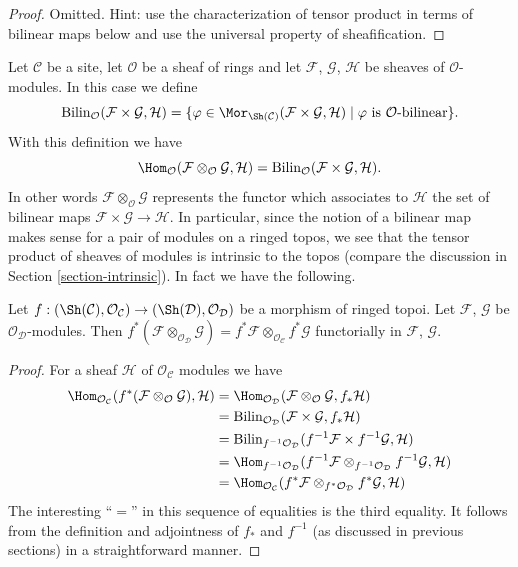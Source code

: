 \begin{proof}
Omitted. Hint: use the characterization of tensor product in terms
of bilinear maps below and use the universal property of sheafification.
\end{proof}

\noindent
Let $\mathcal{C}$ be a site, let $\mathcal{O}$ be a sheaf of rings and let
$\mathcal{F}$, $\mathcal{G}$, $\mathcal{H}$ be sheaves of
$\mathcal{O}$-modules. In this case we define
$$
\text{Bilin}_\mathcal{O}(\mathcal{F} \times \mathcal{G}, \mathcal{H})
=
\{\varphi \in
\Mor_{\Sh(\mathcal{C})}(
\mathcal{F} \times \mathcal{G}, \mathcal{H}) \mid
\varphi \text{ is }\mathcal{O}\text{-bilinear}\}.
$$
With this definition we have
$$
\Hom_\mathcal{O}
(\mathcal{F} \otimes_\mathcal{O} \mathcal{G}, \mathcal{H})
=
\text{Bilin}_\mathcal{O}(\mathcal{F} \times \mathcal{G}, \mathcal{H}).
$$
In other words $\mathcal{F} \otimes_\mathcal{O} \mathcal{G}$
represents the functor which associates to $\mathcal{H}$ the set
of bilinear maps $\mathcal{F} \times \mathcal{G} \to \mathcal{H}$.
In particular, since the notion of a bilinear map makes sense for
a pair of modules on a ringed topos, we see that the tensor
product of sheaves of modules is intrinsic to the topos (compare
the discussion in Section \ref{section-intrinsic}). In fact we
have the following.

\begin{lemma}
\label{lemma-tensor-product-pullback}
Let $f : (\Sh(\mathcal{C}), \mathcal{O}_\mathcal{C})
\to (\Sh(\mathcal{D}), \mathcal{O}_\mathcal{D})$ be
a morphism of ringed topoi. Let $\mathcal{F}$, $\mathcal{G}$
be $\mathcal{O}_\mathcal{D}$-modules. Then
$f^*(\mathcal{F} \otimes_{\mathcal{O}_\mathcal{D}} \mathcal{G})
= f^*\mathcal{F} \otimes_{\mathcal{O}_\mathcal{C}} f^*\mathcal{G}$
functorially in $\mathcal{F}$, $\mathcal{G}$.
\end{lemma}

\begin{proof}
For a sheaf $\mathcal{H}$ of $\mathcal{O}_\mathcal{C}$ modules we
have
\begin{align*}
\Hom_{\mathcal{O}_\mathcal{C}}(
f^*(\mathcal{F} \otimes_\mathcal{O} \mathcal{G}), \mathcal{H})
& =
\Hom_{\mathcal{O}_\mathcal{D}}(
\mathcal{F} \otimes_\mathcal{O} \mathcal{G}, f_*\mathcal{H}) \\
& =
\text{Bilin}_{\mathcal{O}_\mathcal{D}}(
\mathcal{F} \times \mathcal{G}, f_*\mathcal{H}) \\
& =
\text{Bilin}_{f^{-1}\mathcal{O}_\mathcal{D}}(
f^{-1}\mathcal{F} \times f^{-1}\mathcal{G}, \mathcal{H}) \\
& =
\Hom_{f^{-1}\mathcal{O}_\mathcal{D}}(
f^{-1}\mathcal{F} \otimes_{f^{-1}\mathcal{O}_\mathcal{D}} f^{-1}\mathcal{G},
\mathcal{H}) \\
& =
\Hom_{\mathcal{O}_\mathcal{C}}(
f^*\mathcal{F} \otimes_{f^*\mathcal{O}_\mathcal{D}} f^*\mathcal{G},
\mathcal{H})
\end{align*}
The interesting ``$=$'' in this sequence of equalities is the
third equality. It follows from the definition and adjointness of
$f_*$ and $f^{-1}$ (as discussed in previous sections) in a
straightforward manner.
\end{proof}

